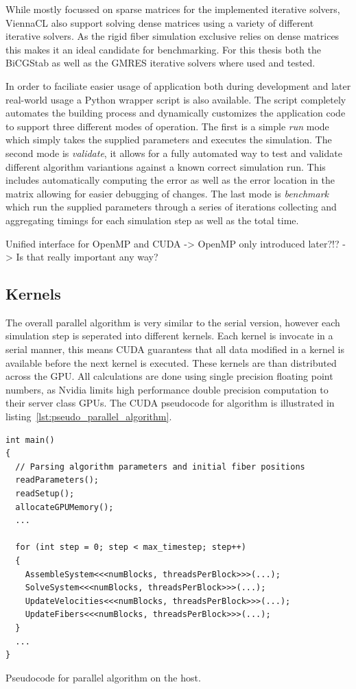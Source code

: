 \documentclass[a4paper,11pt]{kth-mag}
\begin{document}
While mostly focussed on sparse matrices for the implemented iterative solvers, ViennaCL also support solving dense matrices using a variety of different iterative solvers. As the rigid fiber simulation exclusive relies on dense matrices this makes it an ideal candidate for benchmarking. For this thesis both the BiCGStab as well as the GMRES iterative solvers where used and tested.

In order to faciliate easier usage of application both during development and later real-world usage a Python wrapper script is also available. The script completely automates the building process and dynamically customizes the application code to support three different modes of operation. The first is a simple \emph{run} mode which simply takes the supplied parameters and executes the simulation. The second mode is \emph{validate}, it allows for a fully automated way to test and validate different algorithm variantions against a known correct simulation run. This includes automatically computing the error as well as the error location in the matrix allowing for easier debugging of changes. The last mode is \emph{benchmark} which run the supplied parameters through a series of iterations collecting and aggregating timings for each simulation step as well as the total time.

Unified interface for OpenMP and CUDA -> OpenMP only introduced later?!? -> Is that really important any way?

\subsection{Kernels}
The overall parallel algorithm is very similar to the serial version, however each simulation step is seperated into different kernels. Each kernel is invocate in a serial manner, this means CUDA guarantess that all data modified in a kernel is available before the next kernel is executed. These kernels are than distributed across the GPU. All calculations are done using single precision floating point numbers, as Nvidia limits high performance double precision computation to their server class GPUs. The CUDA pseudocode for algorithm is illustrated in listing~\ref{lst:pseudo_parallel_algorithm}.

\begin{listing}
  \centering
  \begin{verbatim}
int main()
{
  // Parsing algorithm parameters and initial fiber positions
  readParameters();
  readSetup();
  allocateGPUMemory();
  ...

  for (int step = 0; step < max_timestep; step++)
  {
    AssembleSystem<<<numBlocks, threadsPerBlock>>>(...);
    SolveSystem<<<numBlocks, threadsPerBlock>>>(...);
    UpdateVelocities<<<numBlocks, threadsPerBlock>>>(...);
    UpdateFibers<<<numBlocks, threadsPerBlock>>>(...);
  }
  ...
}
  \end{verbatim}
  \caption{Pseudocode for parallel algorithm on the host.}
  \label{lst:pseudo_parallel_algorithm}
\end{listing}
\end{document}
